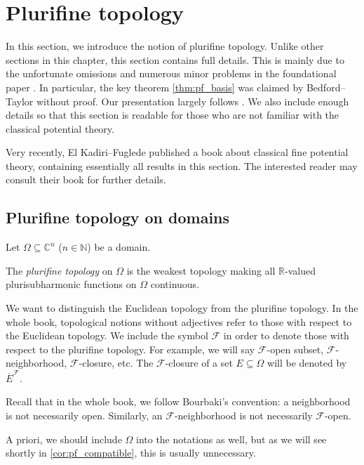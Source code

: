 \section{Plurifine topology}\label{sec:plurifine}

In this section, we introduce the notion of plurifine topology. Unlike other sections in this chapter, this section contains full details. This is mainly due to the unfortunate omissions and numerous minor problems in the foundational paper \cite{BT87}. In particular, the key theorem \cref{thm:pf_basis} was claimed by Bedford--Taylor without proof. Our presentation largely follows \cite{EMW06}. We also include enough details so that this section is readable for those who are not familiar with the classical potential theory.

Very recently, El Kadiri--Fuglede published a book \cite{EKF} about classical fine potential theory, containing essentially all results in this section. The interested reader may consult their book for further details.

\subsection{Plurifine topology on domains}
\label{subsec:plurifine}
Let $\Omega\subseteq \mathbb{C}^n$ ($n\in \mathbb{N}$) be a domain.

\begin{definition}\label{def:pftopologydomain}
  The \emph{plurifine topology} on $\Omega$ is the weakest topology making all $\mathbb{R}$-valued plurisubharmonic functions on $\Omega$ continuous.
\end{definition}
We want to distinguish the Euclidean topology from the plurifine topology.
In the whole book, topological notions without adjectives refer to those with respect to the Euclidean topology. We include the symbol $\mathcal{F}$ in order to denote those with respect to the plurifine topology. For example, we will say $\mathcal{F}$-open subset, $\mathcal{F}$-neighborhood, $\mathcal{F}$-closure, etc.
The $\mathcal{F}$-closure of a set $E\subseteq \Omega$ will be denoted by $\overline{E}^{\mathcal{F}}$.

Recall that in the whole book, we follow Bourbaki's convention: a neighborhood is not necessarily open. Similarly, an $\mathcal{F}$-neighborhood is not necessarily $\mathcal{F}$-open.

A priori, we should include $\Omega$ into the notations as well, but as we will see shortly in \cref{cor:pf_compatible}, this is usually unnecessary.

